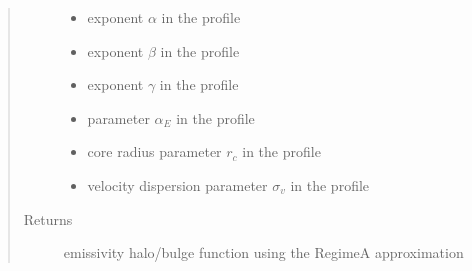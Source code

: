 \documentclass[letterpaper,10pt,english]{sphinxmanual}
\begin{document}
\begin{fulllineitems}
\begin{quote}
\begin{description}
\begin{itemize}
\item {} 
\sphinxAtStartPar
{} \textendash{} exponent \(\alpha\) in the {\hyperref[\detokenize{diffsph.profiles:diffsph.profiles.templates.hdz}]{}} profile

\item {} 
\sphinxAtStartPar
{} \textendash{} exponent \(\beta\) in the {\hyperref[\detokenize{diffsph.profiles:diffsph.profiles.templates.hdz}]{}} profile

\item {} 
\sphinxAtStartPar
{} \textendash{} exponent \(\gamma\) in the {\hyperref[\detokenize{diffsph.profiles:diffsph.profiles.templates.hdz}]{}} profile

\item {} 
\sphinxAtStartPar
{} \textendash{} parameter \(\alpha_E\) in the {\hyperref[\detokenize{diffsph.profiles:diffsph.profiles.templates.enst}]{}} profile

\item {} 
\sphinxAtStartPar
{} \textendash{} core radius parameter \(r_c\) in the {\hyperref[\detokenize{diffsph.profiles:diffsph.profiles.templates.cnfw}]{}} profile

\item {} 
\sphinxAtStartPar
{} \textendash{} velocity dispersion parameter \(\sigma_v\) in the {\hyperref[\detokenize{diffsph.profiles:diffsph.profiles.templates.sis}]{}} profile

\end{itemize}

\item[{Returns}] \leavevmode
\sphinxAtStartPar
emissivity halo/bulge function using the Regime\sphinxhyphen{}A approximation

\end{description}\end{quote}

\end{fulllineitems}
\end{document}
